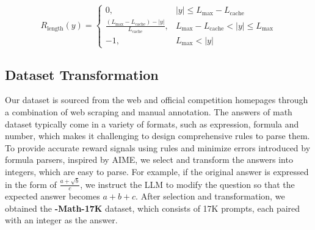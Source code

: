 \begin{equation}
R_{\text{length}}(y) =
\begin{cases}
0, & |y| \le L_{\text{max}} - L_{\text{cache}} \\
\frac{(L_{\text{max}} - L_{\text{cache}}) - |y|}{L_{\text{cache}}}, & L_{\text{max}} - L_{\text{cache}}<|y|\le L_{\text{max}} \\
-1, & L_{\text{max}} < |y|
\end{cases}
\label{eq:soft_punish}
\end{equation}




\subsection{Dataset Transformation}
\label{sec:dataprocess}

Our dataset is sourced from the web and official competition homepages through a combination of web scraping and manual annotation.
The answers of math dataset typically come in a variety of formats, such as expression, formula and number, which makes it challenging to design comprehensive rules to parse them.
To provide accurate reward signals using rules and minimize errors introduced by formula parsers, inspired by AIME, we select and transform the answers into integers, which are easy to parse.
For example, if the original answer is expressed in the form of \( \frac{a + \sqrt{b}}{c} \), we instruct the LLM to modify the question so that the expected answer becomes \( a + b + c \).
After selection and transformation, we obtained the \textbf{\method-Math-17K} dataset, which consists of 17K prompts, each paired with an integer as the answer.



